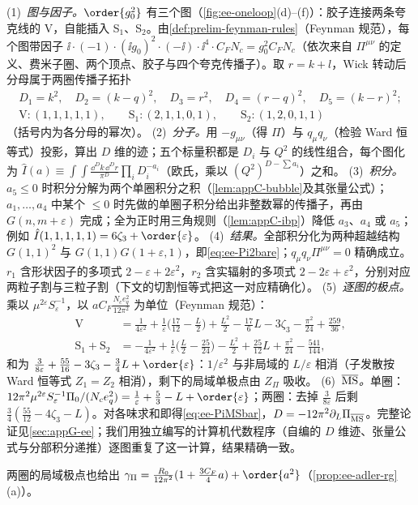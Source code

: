 \begin{proofsketch}
(1)~\emph{图与因子。}$\order{g_0^2}$ 有三个图（\cref{fig:ee-oneloop}(d)--(f)）：胶子连接两条夸克线的 V，自能插入 S$_1$、S$_2$。由\cref{def:prelim-feynman-rules}（Feynman 规范），每个图带因子 $\ii\cdot(-1)\cdot(\ii g_0)^2\cdot(-\ii)\cdot\ii^4\cdot C_FN_c=g_0^2C_FN_c$（依次来自 $\Pi^{\mu\nu}$ 的定义、费米子圈、两个顶点、胶子与四个夸克传播子）。取 $r=k+l$，Wick 转动后分母属于两圈传播子拓扑
\begin{equation}\label{eq:ee-topo}
\begin{gathered}
D_1=k^2,\quad D_2=(k-q)^2,\quad D_3=r^2,\quad D_4=(r-q)^2,\quad D_5=(k-r)^2;\\
\mathrm V:(1,1,1,1,1),\qquad \mathrm S_1:(2,1,1,0,1),\qquad \mathrm S_2:(1,2,0,1,1)
\end{gathered}
\end{equation}
（括号内为各分母的幂次）。
(2)~\emph{分子。}用 $-g_{\mu\nu}$（得 $\Pi$）与 $q_\mu q_\nu$（检验 Ward 恒等式）投影，算出 $D$ 维的迹；五个标量积都是 $D_i$ 与 $Q^2$ 的线性组合，每个图化为 $\hat I(a)\equiv\int\!\!\int\frac{\dd^Dk\,\dd^Dr}{\pi^D}\prod_iD_i^{-a_i}$（欧氏，乘以 $(Q^2)^{D-\sum a_i}$）之和。
(3)~\emph{积分。}$a_5\le0$ 时积分分解为两个单圈积分之积（\cref{lem:appC-bubble}及其张量公式）；$a_1,\dots,a_4$ 中某个 $\le0$ 时先做的单圈子积分给出非整数幂的传播子，再由 $G(n,m+\varepsilon)$ 完成；全为正时用三角规则（\cref{lem:appC-ibp}）降低 $a_3$、$a_4$ 或 $a_5$；例如 $\hat I(1,1,1,1,1)=6\zeta_3+\order{\varepsilon}$。
(4)~\emph{结果。}全部积分化为两种超越结构 $G(1,1)^2$ 与 $G(1,1)G(1+\varepsilon,1)$，即\cref{eq:ee-Pi2bare}；$q_\mu q_\nu\Pi^{\mu\nu}=0$ 精确成立。$r_1$ 含形状因子的多项式 $2-\varepsilon+2\varepsilon^2$，$r_2$ 含实辐射的多项式 $2-2\varepsilon+\varepsilon^2$，分别对应两粒子割与三粒子割（下文的切割恒等式把这一对应精确化）。
(5)~\emph{逐图的极点。}乘以 $\mu^{2\varepsilon}S_\varepsilon^{-1}$，以 $aC_F\frac{N_ce_q^2}{12\pi^2}$ 为单位（Feynman 规范）：
\[
\begin{aligned}
\mathrm V&=\tfrac{1}{4\varepsilon^2}+\tfrac{1}{\varepsilon}\big(\tfrac{17}{12}-\tfrac L2\big)+\tfrac{L^2}2-\tfrac{17}6L-3\zeta_3-\tfrac{\pi^2}{24}+\tfrac{259}{36},\\
\mathrm S_1+\mathrm S_2&=-\tfrac{1}{4\varepsilon^2}+\tfrac1\varepsilon\big(\tfrac L2-\tfrac{25}{24}\big)-\tfrac{L^2}2+\tfrac{25}{12}L+\tfrac{\pi^2}{24}-\tfrac{541}{144},
\end{aligned}
\]
和为 $\frac{3}{8\varepsilon}+\frac{55}{16}-3\zeta_3-\frac34L+\order{\varepsilon}$：$1/\varepsilon^2$ 与非局域的 $L/\varepsilon$ 相消（子发散按 Ward 恒等式 $Z_1=Z_2$ 相消），剩下的局域单极点由 $Z_\Pi$ 吸收。
(6)~\emph{$\overline{\rm MS}$。}单圈：$12\pi^2\mu^{2\varepsilon}S_\varepsilon^{-1}\Pi_0/(N_ce_q^2)=\frac1\varepsilon+\frac53-L+\order{\varepsilon}$；两圈：去掉 $\frac3{8\varepsilon}$ 后剩 $\frac34(\frac{55}{12}-4\zeta_3-L)$。对各味求和即得\cref{eq:ee-PiMSbar}，$D=-12\pi^2\partial_L\Pi_{\overline{\rm MS}}$。完整论证见\cref{sec:appG-ee}；我们用独立编写的计算机代数程序（自编的 $D$ 维迹、张量公式与分部积分递推）逐图重复了这一计算，结果精确一致。
\end{proofsketch}
两圈的局域极点也给出 $\gamma_\Pi=\frac{R_0}{12\pi^2}(1+\frac{3C_F}4a)+\order{a^2}$（\cref{prop:ee-adler-rg}(a)）。

